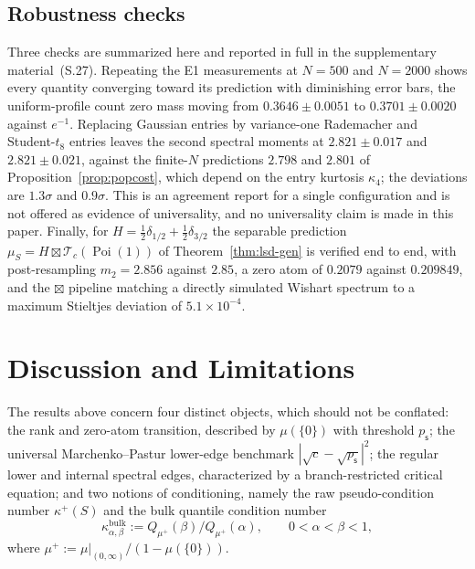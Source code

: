 \documentclass[lettersize,journal]{IEEEtran}
\theoremstyle{remark}
\begin{document}
\subsection{Robustness checks}
\label{sec:ix-appendix}

Three checks are summarized here and reported in full in the supplementary
material~(S.27). Repeating the E1 measurements at $N=500$ and $N=2000$ shows every
quantity converging toward its prediction with diminishing error bars, the
uniform-profile count zero mass moving from $0.3646\pm0.0051$ to
$0.3701\pm0.0020$ against $e^{-1}$. Replacing Gaussian entries by variance-one
Rademacher and Student-$t_8$ entries leaves the second spectral moments at
$2.821\pm0.017$ and $2.821\pm0.021$, against the finite-$N$ predictions $2.798$
and $2.801$ of Proposition~\ref{prop:popcost}, which depend on the entry
kurtosis $\kappa_4$; the deviations are $1.3\sigma$ and $0.9\sigma$. This is an
agreement report for a single configuration and is not offered as evidence of
universality, and no universality claim is made in this paper. Finally, for
$H=\tfrac12\delta_{1/2}+\tfrac12\delta_{3/2}$ the separable prediction
$\mu_S=H\boxtimes\mathcal{T}_c(\operatorname{Poi}(1))$ of
Theorem~\ref{thm:lsd-gen} is verified end to end, with post-resampling
$m_2=2.856$ against $2.85$, a zero atom of $0.2079$ against $0.209849$, and the
$\boxtimes$ pipeline matching a directly simulated Wishart spectrum to a
maximum Stieltjes deviation of $5.1\times10^{-4}$.


\section{Discussion and Limitations}
\label{sec:limits}

The results above concern four distinct objects, which should not be
conflated\cite{douc2005comparison}: the rank and zero-atom transition, described by $\mu(\{0\})$ with
threshold $p_{\mathsf{s}}$; the universal Marchenko--Pastur lower-edge
benchmark $|\sqrt c-\sqrt{p_{\mathsf{s}}}|^2$; the regular lower and internal
spectral edges, characterized by a branch-restricted critical equation; and
two notions of conditioning, namely the raw pseudo-condition number
$\kappa^+(S)$ and the bulk quantile condition number
\begin{equation}
  \kappa_{\alpha,\beta}^{\mathrm{bulk}}
    :=Q_{\mu^+}(\beta)/Q_{\mu^+}(\alpha),\qquad 0<\alpha<\beta<1,
  \label{eq:bulkcond}
\end{equation}
where $\mu^+:=\mu|_{(0,\infty)}/(1-\mu(\{0\}))$.
\end{document}
